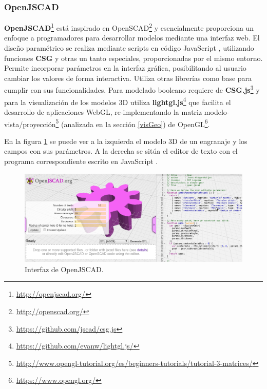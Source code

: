 \subsubsection{OpenJSCAD} 
\textbf{\Gls{OpenJSCAD}}\footnote{\url{http://openjscad.org/}} está inspirado en \Gls{OpenSCAD}\footnote{\url{http://openscad.org/}} y esencialmente proporciona un enfoque a programadores para desarrollar modelos mediante una interfaz web. El diseño paramétrico se realiza mediante scripts en código \Gls{JavaScript} \citep{flanagan2007javascript}, utilizando  funciones \textbf{CSG} y otras un tanto especiales, proporcionadas por el mismo entorno.
Permite incorporar parámetros en la interfaz gráfica, posibilitando al usuario cambiar los  valores de forma interactiva. Utiliza otras librerías como base para cumplir con sus funcionalidades. Para modelado booleano requiere de \textbf{\Gls{CSG.js}}\footnote{\url{https://github.com/jscad/csg.js}} y para la visualización de los modelos 3D  utiliza \textbf{\gls{lightgl.js}}\footnote{\url{https://github.com/evanw/lightgl.js/}} que facilita el desarrollo de aplicaciones WebGL, re-implementando la matriz modelo-vista/proyección\footnote{\url{http://www.opengl-tutorial.org/es/beginners-tutorials/tutorial-3-matrices/}} (analizada en   la sección \ref{visGeo}) de OpenGL\footnote{\url{https://www.opengl.org/}}. 

En la figura \ref{fig:openjscad} se puede ver a la izquierda el modelo 3D de un engranaje y los campos con sus parámetros. A la derecha se sitúa el editor de texto con el programa correspondiente escrito en JavaScript \citep{openJSCADorg}.

\begin{figure}[h]
\includegraphics[width=14cm]{Img/openjscad-params.png}
\centering
\caption{\footnotesize{
Interfaz de OpenJSCAD.
}}
\label{fig:openjscad}
\end{figure}



